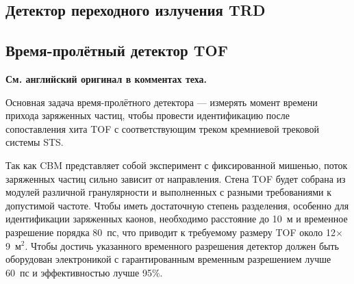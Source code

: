 
\subsection{Детектор переходного излучения TRD}\label{sec:secTRD}


\subsection{Время-пролётный детектор TOF}\label{sec:secTOF}

\textbf{См. английский оригинал в комментах теха.}


Основная задача время-пролётного детектора --- измерять момент времени прихода заряженных частиц, чтобы провести идентификацию после сопоставления хита TOF с соответствующим треком кремниевой трековой системы STS.


Так как CBM представляет собой эксперимент с фиксированной мишенью, поток заряженных частиц сильно зависит от направления. Стена TOF будет собрана из модулей различной гранулярности и выполненных с разными требованиями к допустимой частоте. Чтобы иметь достаточную степень разделения, особенно для идентификации заряженных каонов, необходимо расстояние до 10~м и временное разрешение порядка 80~пс, что приводит к требуемому размеру TOF около 12$\times$9~м$^2$. Чтобы достичь указанного временного разрешения детектор должен быть оборудован электроникой с гарантированным временным разрешением лучше 60~пс и эффективностью лучше 95\%.


